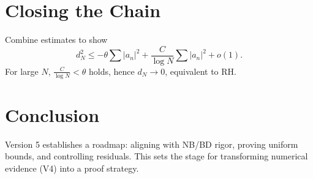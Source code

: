 \documentclass[12pt]{article}
\begin{document}
\section{Closing the Chain}
Combine estimates to show
\begin{equation}
d_N^2 \le -\theta \sum|a_n|^2 + \frac{C}{\log N}\sum|a_n|^2 + o(1).
\end{equation}
For large $N$, $\frac{C}{\log N} < \theta$ holds, hence $d_N \to 0$, equivalent to RH.

\section{Conclusion}
Version 5 establishes a roadmap: aligning with NB/BD rigor, proving uniform bounds, and controlling residuals. 
This sets the stage for transforming numerical evidence (V4) into a proof strategy.
\end{document}
